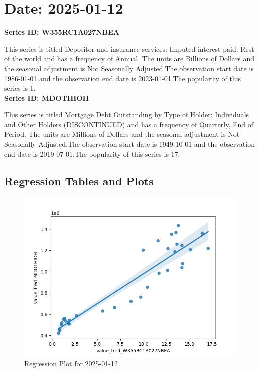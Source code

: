 \section{Date: 2025-01-12}
\noindent \textbf{Series ID: W355RC1A027NBEA} 

\noindent This series is titled Depositor and insurance services: Imputed interest paid: Rest of the world and has a frequency of Annual. The units are Billions of Dollars and the seasonal adjustment is Not Seasonally Adjusted.The observation start date is 1986-01-01 and the observation end date is 2023-01-01.The popularity of this series is 1. \\ 

\noindent \textbf{Series ID: MDOTHIOH} 

\noindent This series is titled Mortgage Debt Outstanding by Type of Holder: Individuals and Other Holders (DISCONTINUED) and has a frequency of Quarterly, End of Period. The units are Millions of Dollars and the seasonal adjustment is Not Seasonally Adjusted.The observation start date is 1949-10-01 and the observation end date is 2019-07-01.The popularity of this series is 17. \\ 

\subsection{Regression Tables and Plots}


\begin{figure}
\centering
\includegraphics[scale = 0.9]{plots/plot_2025-01-12.png}
\caption{Regression Plot for 2025-01-12}
\end{figure}
\newpage
